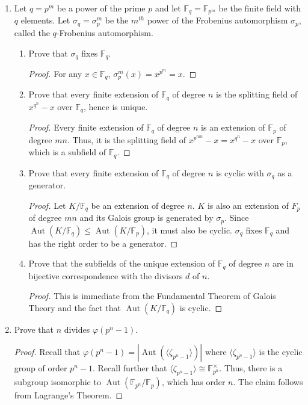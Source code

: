 \documentclass{report}
\newcommand{\F}{\mathbb{F}}
\DeclareMathOperator{\Aut}{Aut}
\begin{document}
\begin{enumerate}
\begin{proof}
			Moreover, any automorphism of $\F_p (\alpha) / \F_p$ can be defined by where it takes $\alpha$, so $\langle\sigma\rangle=\Aut(\F_p (\alpha) / \F_p)$.
		\end{proof}
	\item Let $q=p^m$ be a power of the prime $p$ and let $\F_q=\F_{p^m}$ be the finite field with $q$ elements.
		Let $\sigma_q=\sigma_p^m$ be the $m^{th}$ power of the Frobenius automorphism $\sigma_p$, called the $q$-Frobenius automorphism.
		\begin{enumerate} [label=(\alph*)]
			\item Prove that $\sigma_q$ fixes $\F_q$. 
				\begin{proof}
					For any $x\in\F_q$, $\sigma_p^m(x)=x^{p^m}=x$.
				\end{proof}
			\item Prove that every finite extension of $\F_q$ of degree $n$ is the splitting field of $x^{q^n}-x$ over $\F_q$, hence is unique.
				\begin{proof}
					Every finite extension of $\F_q$ of degree $n$ is an extension of $\F_p$ of degree $mn$.
					Thus, it is the splitting field of $x^{p^{nm}}-x=x^{q^n}-x$ over $\F_p$, which is a subfield of $\F_q$.
				\end{proof}
			\item Prove that every finite extension of $\F_q$ of degree $n$ is cyclic with $\sigma_q$ as a generator.
				\begin{proof}
					Let $K / \F_q$ be an extension of degree $n$. $K$ is also an extension of $F_p$ of degree $mn$ and its Galois group is generated by $\sigma_p$. 
					Since $\Aut(K / \F_q)\leq \Aut(K / \F_p)$, it must also be cyclic. $\sigma_q$ fixes $\F_q$ and has the right order to be a generator.
				\end{proof}
			\item Prove that the subfields of the unique extension of $\F_q$ of degree $n$ are in bijective correspondence with the divisors $d$ of $n$.
				\begin{proof}
					This is immediate from the Fundamental Theorem of Galois Theory and the fact that $\Aut(K / \F_q)$ is cyclic. 
				\end{proof}
		\end{enumerate}
	\item Prove that $n$ divides $\varphi(p^n-1)$.
		\begin{proof}
			Recall that $\varphi(p^n-1)=|\Aut(\langle\zeta_{p^n-1}\rangle)|$ where $\langle\zeta_{p^{n}-1}\rangle$ is the cyclic group of order $p^n-1$. 
			Recall further that $\langle\zeta_{p^n-1}\rangle\cong\F_{p^n}^\times$. Thus, there is a subgroup isomorphic to $\Aut(\F_{p^n} / \F_p)$, which has order $n$.
			The claim follows from Lagrange's Theorem.
		\end{proof}
\end{enumerate}
\end{document}
